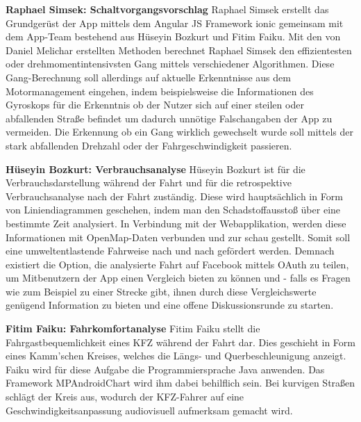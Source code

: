 	\textbf{Raphael Simsek: Schaltvorgangsvorschlag\newline}
	Raphael Simsek erstellt das Grundgerüst der App mittels dem Angular JS Framework ionic gemeinsam mit dem App-Team bestehend aus Hüseyin Bozkurt und Fitim Faiku.
	Mit den von Daniel Melichar erstellten Methoden berechnet Raphael Simsek den effizientesten oder drehmomentintensivsten Gang mittels verschiedener Algorithmen. Diese Gang-Berechnung soll allerdings auf aktuelle Erkenntnisse aus dem Motormanagement eingehen, indem beispielsweise die Informationen des Gyroskops für die Erkenntnis ob der Nutzer sich auf einer steilen oder abfallenden Straße befindet um dadurch unnötige Falschangaben der App zu vermeiden. Die Erkennung ob ein Gang wirklich gewechselt wurde soll mittels der stark abfallenden Drehzahl oder der Fahrgeschwindigkeit passieren.
	
	\textbf{Hüseyin Bozkurt: Verbrauchsanalyse\newline}
	 Hüseyin Bozkurt ist für die Verbrauchsdarstellung während der Fahrt und für die retrospektive Verbrauchsanalyse nach der Fahrt zuständig.
	 Diese wird hauptsächlich in Form von Liniendiagrammen geschehen, indem man den Schadstoffausstoß über eine bestimmte Zeit analysiert. In Verbindung mit der Webapplikation, werden diese Informationen mit OpenMap-Daten verbunden und zur schau gestellt.
	 Somit soll eine umweltentlastende Fahrweise nach und nach gefördert werden. Demnach existiert die Option, die analysierte Fahrt auf Facebook mittels OAuth zu teilen, um Mitbenutzern der App einen Vergleich bieten zu können und - falls es Fragen wie zum Beispiel zu einer Strecke gibt, ihnen durch diese Vergleichswerte genügend Information zu bieten und eine offene Diskussionsrunde zu starten.
	
	\textbf{Fitim Faiku: Fahrkomfortanalyse\newline}
	 Fitim Faiku stellt die Fahrgastbequemlichkeit eines KFZ während der Fahrt dar.
	 Dies geschieht in Form eines Kamm'schen Kreises, welches die Längs- und Querbeschleunigung anzeigt. Faiku wird für diese Aufgabe die Programmiersprache Java anwenden.
	 Das Framework MPAndroidChart wird ihm dabei behilflich sein. Bei kurvigen Straßen schlägt der Kreis aus, wodurch der KFZ-Fahrer auf eine Geschwindigkeitsanpassung audiovisuell aufmerksam gemacht wird.
